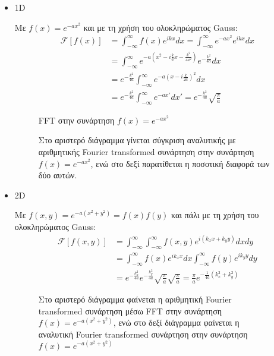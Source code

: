 \begin{itemize}
\item 1D

Με $f(x)=e^{-ax^{2}}$ και με τη χρήση του ολοκληρώματος Gauss:
\begin{align*}
\mathcal{F}[f(x)]&= \int_{-\infty}^{\infty} f(x) e^{ik x}dx=\int_{-\infty}^{\infty}e^{-ax^{2}}e^{ik x}dx\\&= \int_{-\infty}^{\infty} e^{-a(x^{2}-i\frac{k}{a}x-\frac{k^{2}}{4a^{2}})}e^{-\frac{k^{2}}{4a}}  dx\\&=e^{-\frac{k^{2}}{4a}}\int_{-\infty}^{\infty} e^{-a(x-i\frac{k}{2a})^{2}}dx \\&=e^{-\frac{k^{2}}{4a}}\int_{-\infty}^{\infty} e^{-ax'}dx '=e^{-\frac{k^{2}}{4a}}\sqrt{\frac{\pi}{a}}
\end{align*}

\newpage

\begin{figure}[htp]
\centering
{}\caption{FFT στην συνάρτηση $f(x)=e^{-ax^{2}}$}\label{fig:3}
\end{figure}

\begin{figure}[htp]
\centering
{}\caption{Στο αριστερό διάγραμμα γίνεται σύγκριση αναλυτικής με αριθμητικής Fourier transformed συνάρτηση στην συνάρτηση $f(x)=e^{-ax^{2}}$, ενώ στο δεξί παρατίθεται η ποσοτική διαφορά των δύο αυτών.}\label{fig:4}
\end{figure}

\clearpage

\item 2D

Με $f(x,y)=e^{-a(x^{2}+y^{2})}=f(x)f(y)$ και πάλι με τη χρήση του ολοκληρώματος Gauss:
\begin{align*}
\mathcal{F}[f(x,y)]&=\int_{-\infty}^{\infty}\int_{-\infty}^{\infty}f(x,y)e^{i(k_{x}x+k_{y}y)}dxdy\\&=\int_{-\infty}^{\infty}f(x)e^{ik_{x}x}dx \int_{-\infty}^{\infty}f(y)e^{ik_{y}y}dy\\&= e^{-\frac{k_{x}^{2}}{4a}}e^{-\frac{k_{y}^{2}}{4a}}\sqrt{\frac{\pi}{a}}\sqrt{\frac{\pi}{a}}=\frac{\pi}{a}e^{-\frac{1}{4a}(k_{x}^{2}+k_{y}^{2})}
\end{align*}



\begin{figure}[htp]
\centering
{}\caption{Στο αριστερό διάγραμμα φαίνεται η αριθμητική Fourier transformed συνάρτηση μέσω FFT στην συνάρτηση $f(x)=e^{-a(x^{2}+y^{2})}$, ενώ στο δεξί διάγραμμα φαίνεται η αναλυτική Fourier transformed συνάρτηση στην συνάρτηση $f(x)=e^{-a(x^{2}+y^{2})}$}\label{fig:6}
\end{figure}


\end{itemize}
